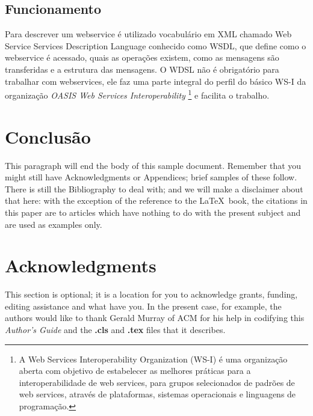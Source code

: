 \documentclass{acm_proc_article-sp}
\begin{document}
	\subsection{Funcionamento}
	
		Para descrever um webservice é utilizado vocabulário em XML chamado Web Service Services Description Language conhecido como WSDL, que define como o webservice é acessado, quais as operações existem, como as mensagens são transferidas e a estrutura das mensagens. O WDSL não é obrigatório para trabalhar com webservices, ele faz uma parte integral do perfil do básico WS-I da organização \emph{OASIS Web Services Interoperability} \footnote{A Web Services Interoperability Organization (WS-I) é uma organização aberta com objetivo de estabelecer as melhores práticas para a interoperabilidade de web services, para grupos selecionados de padrões de web services, através de plataformas, sistemas operacionais e linguagens de programação.\cite{OASIS-WS-I-SITE}} e facilita o trabalho. 
 

\section{Conclusão}
This paragraph will end the body of this sample document.
Remember that you might still have Acknowledgments or
Appendices; brief samples of these
follow.  There is still the Bibliography to deal with; and
we will make a disclaimer about that here: with the exception
of the reference to the \LaTeX\ book, the citations in
this paper are to articles which have nothing to
do with the present subject and are used as
examples only.

\section{Acknowledgments}
This section is optional; it is a location for you
to acknowledge grants, funding, editing assistance and
what have you.  In the present case, for example, the
authors would like to thank Gerald Murray of ACM for
his help in codifying this \textit{Author's Guide}
and the \textbf{.cls} and \textbf{.tex} files that it describes.

%

%
%
\appendix
\end{document}
